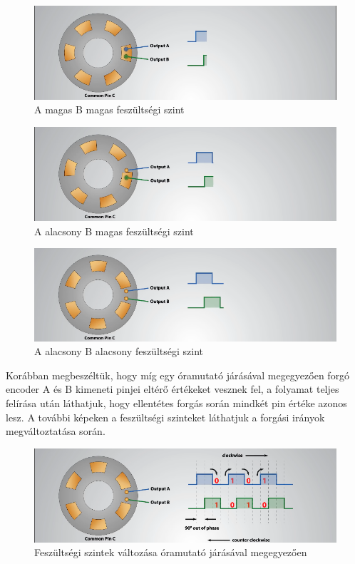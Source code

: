 \documentclass[
]{thesis-ekf}
\theoremstyle{definition}
\theoremstyle{remark}
\begin{document}
			\begin{figure}[h]
			\centering
			\includegraphics[scale=0.50]{./images/secondenc}
			\caption{A magas B magas feszültségi szint}
			\label{fig:second}
			\end{figure}
			\begin{figure}[h]
				\centering
				\includegraphics[scale=0.50]{./images/thirdenc}
				\caption{A alacsony B magas feszültségi szint}
				\label{fig:third}
			\end{figure}
			\begin{figure}[h]
				\centering
				\includegraphics[scale=0.50]{./images/forthenc}
				\caption{A alacsony B alacsony feszültségi szint}
				\label{fig:forth}
			\end{figure}
			\par Korábban megbeszéltük, hogy míg egy óramutató járásával megegyezően forgó encoder A és B kimeneti pinjei eltérő értékeket vesznek fel, a folyamat teljes felírása után láthatjuk, hogy ellentétes forgás során mindkét pin értéke azonos lesz. A további képeken a feszültségi szinteket láthatjuk a forgási irányok megváltoztatása során.
			\begin{figure}[h]
				\centering
				\includegraphics[scale=0.50]{./images/fullenc}
				\caption{Feszültségi szintek változása óramutató járásával megegyezően}
				\label{fig:fullenc}
			\end{figure}
\end{document}
